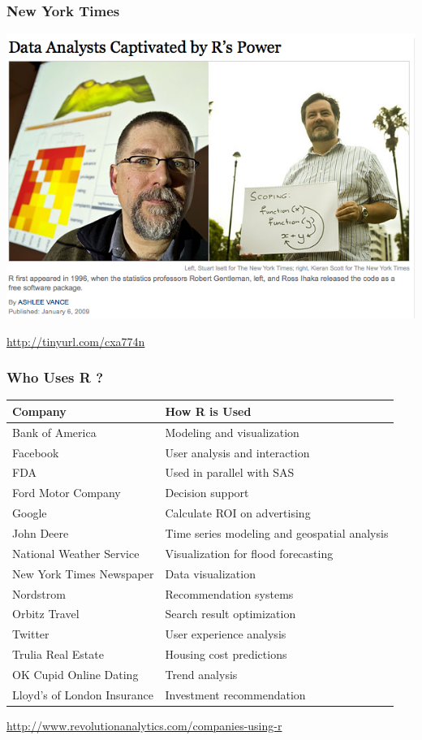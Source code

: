 \documentclass{beamer}
\begin{document}

\begin{frame}[fragile]
\frametitle{New York Times}
\begin{center}
\includegraphics{../IMG/nytimes.png}
\scriptsize
\end{center}
\url{http://tinyurl.com/cxa774n}
\end{frame}


\begin{frame}[fragile]
\frametitle{Who Uses R ? }
\small
\begin{center}
\begin{tabular}{| l | l |}
  \hline         
  \textbf{Company} & \textbf{How R is Used} \\ \hline
  Bank of America & Modeling and visualization \\ \hline
  Facebook & User analysis and interaction  \\ \hline
  FDA & Used in parallel with SAS \\ \hline
  Ford Motor Company & Decision support \\ \hline
  Google & Calculate ROI on advertising \\ \hline
  John Deere & Time series modeling and geospatial analysis \\ \hline
  National Weather Service & Visualization for flood forecasting \\ \hline
  New York Times Newspaper & Data visualization \\ \hline
  Nordstrom & Recommendation systems \\ \hline
  Orbitz Travel & Search result optimization \\ \hline
  Twitter & User experience analysis \\ \hline
  Trulia Real Estate & Housing cost predictions \\ \hline
  OK Cupid Online Dating & Trend analysis \\ \hline
  Lloyd's of London Insurance & Investment recommendation \\ \hline
  \hline  
\end{tabular}
\end{center}
\footnotesize
\url{http://www.revolutionanalytics.com/companies-using-r}
\end{frame}
\end{document}
